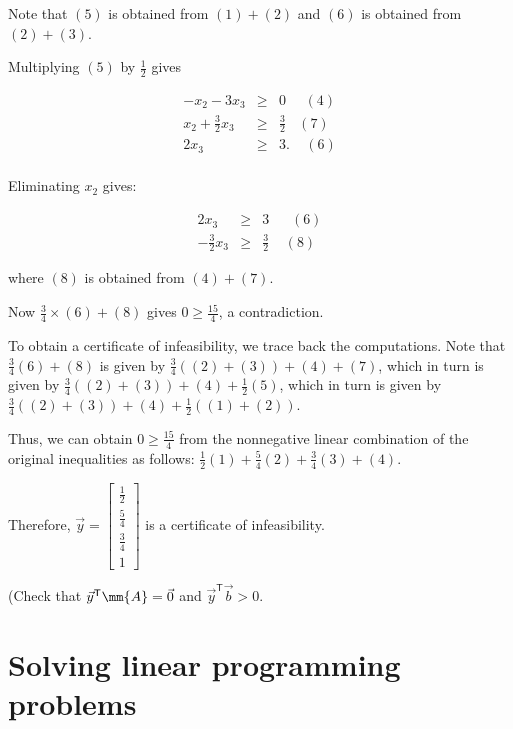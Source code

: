 \begin{enumerate}
  Note that \((5)\) is obtained from \((1) + (2)\) and \((6)\) is
  obtained from \((2) + (3)\).

  Multiplying \((5)\) by \(\frac{1}{2}\) gives

  \begin{eqnarray*}
  -x_2 - 3x_3 & \geq & 0~~~~~~(4) \\
  x_2 + \frac{3}{2}x_3& \geq & \frac{3}{2}~~~~(7) \\
  2x_3  & \geq & 3.~~~~~(6) \\
  \end{eqnarray*}

  Eliminating \(x_2\) gives:

  \begin{eqnarray*}
  2x_3  & \geq & 3~~~~~~~(6) \\
  - \frac{3}{2} x_3 & \geq & \frac{3}{2}~~~~~(8)
  \end{eqnarray*}

  where \((8)\) is obtained from \((4) + (7)\).

  Now \(\frac{3}{4}\times (6) + (8)\) gives \(0 \geq \frac{15}{4}\), a
  contradiction.

  To obtain a certificate of infeasibility, we trace back the
  computations. Note that \(\frac{3}{4} (6) + (8)\) is given by
  \(\frac{3}{4} ((2)+(3)) + (4)+ (7)\), which in turn is given by
  \(\frac{3}{4} ((2)+(3)) + (4)+ \frac{1}{2}(5)\), which in turn is
  given by \(\frac{3}{4} ((2)+(3)) + (4)+ \frac{1}{2}((1) + (2))\).

  Thus, we can obtain \(0 \geq \frac{15}{4}\) from the nonnegative
  linear combination of the original inequalities as follows:
  \(\frac{1}{2} (1) + \frac{5}{4} (2) + \frac{3}{4} (3) + (4)\).

  Therefore,
  \(\vec{y} = \begin{bmatrix} \frac{1}{2} \\ \frac{5}{4} \\ \frac{3}{4} \\ 1\end{bmatrix}\)
  is a certificate of infeasibility.

  (Check that \(\vec{y}^\mathsf{T}\mm{A} = \vec{0}\) and
  \(\vec{y}^\mathsf{T} \vec{b} \gt 0\).
\end{enumerate}

\section{Solving linear programming problems}\label{fund-lp}

